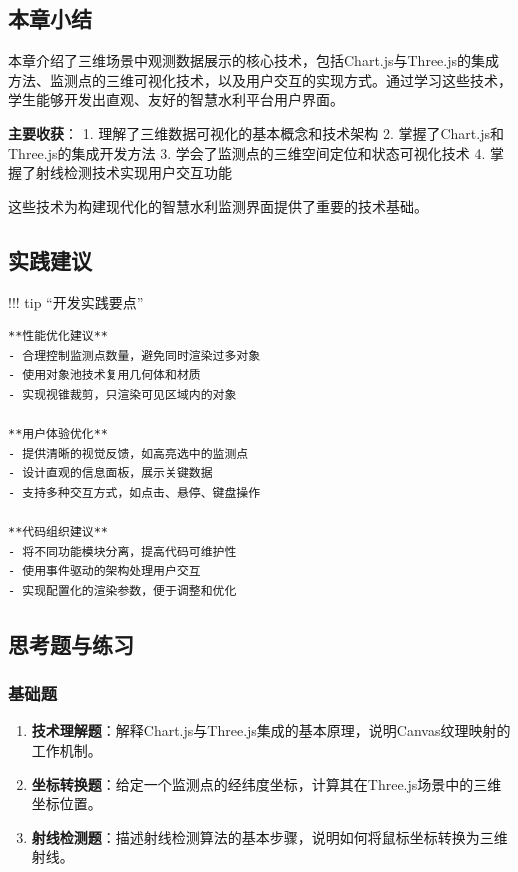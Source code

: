 \subsection{本章小结}\label{ux672cux7ae0ux5c0fux7ed3}

本章介绍了三维场景中观测数据展示的核心技术，包括Chart.js与Three.js的集成方法、监测点的三维可视化技术，以及用户交互的实现方式。通过学习这些技术，学生能够开发出直观、友好的智慧水利平台用户界面。

\textbf{主要收获}： 1. 理解了三维数据可视化的基本概念和技术架构 2. 掌握了Chart.js和Three.js的集成开发方法 3. 学会了监测点的三维空间定位和状态可视化技术 4. 掌握了射线检测技术实现用户交互功能

这些技术为构建现代化的智慧水利监测界面提供了重要的技术基础。

\subsection{实践建议}\label{ux5b9eux8df5ux5efaux8bae}

!!! tip ``开发实践要点''

\begin{verbatim}
**性能优化建议**
- 合理控制监测点数量，避免同时渲染过多对象
- 使用对象池技术复用几何体和材质
- 实现视锥裁剪，只渲染可见区域内的对象

**用户体验优化**
- 提供清晰的视觉反馈，如高亮选中的监测点
- 设计直观的信息面板，展示关键数据
- 支持多种交互方式，如点击、悬停、键盘操作

**代码组织建议**
- 将不同功能模块分离，提高代码可维护性
- 使用事件驱动的架构处理用户交互
- 实现配置化的渲染参数，便于调整和优化
\end{verbatim}

\subsection{思考题与练习}\label{ux601dux8003ux9898ux4e0eux7ec3ux4e60}

\subsubsection{基础题}\label{ux57faux7840ux9898}

\begin{enumerate}
\def\labelenumi{\arabic{enumi}.}
\item
  \textbf{技术理解题}：解释Chart.js与Three.js集成的基本原理，说明Canvas纹理映射的工作机制。
\item
  \textbf{坐标转换题}：给定一个监测点的经纬度坐标，计算其在Three.js场景中的三维坐标位置。
\item
  \textbf{射线检测题}：描述射线检测算法的基本步骤，说明如何将鼠标坐标转换为三维射线。
\end{enumerate}

